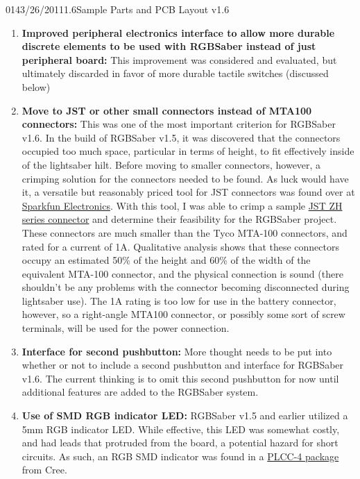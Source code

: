 \documentclass[12pt,letterpaper,onecolumn]{article}
\begin{document}
\begin{nbentry}{014}{3/26/2011}{1.6}{Sample Parts and PCB Layout v1.6}
\begin{enumerate}
\item \textbf{Improved peripheral electronics interface to allow more durable discrete elements to be used with RGBSaber instead of just peripheral board:} This improvement was considered and evaluated, but ultimately discarded in favor of more durable tactile switches (discussed below)
\item \textbf{Move to JST or other small connectors instead of MTA100 connectors:} This was one of the most important criterion for RGBSaber v1.6. In the build of RGBSaber v1.5, it was discovered that the connectors occupied too much space, particular in terms of height, to fit effectively inside of the lightsaber hilt. Before moving to smaller connectors, however, a crimping solution for the connectors needed to be found. As luck would have it, a versatile but reasonably priced tool for JST connectors was found over at \href{http://www.sparkfun.com/products/10219}{Sparkfun Electronics}. With this tool, I was able to crimp a sample \href{http://www.jst-mfg.com/product/pdf/eng/eZH.pdf}{JST ZH series connector} and determine their feasibility for the RGBSaber project. These connectors are much smaller than the Tyco MTA-100 connectors, and rated for a current of 1A. Qualitative analysis shows that these connectors occupy an estimated 50\% of the height and 60\% of the width of the equivalent MTA-100 connector, and the physical connection is sound (there shouldn't be any problems with the connector becoming disconnected during lightsaber use). The 1A rating is too low for use in the battery connector, however, so a right-angle MTA100 connector, or possibly some sort of screw terminals, will be used for the power connection.
\item \textbf{Interface for second pushbutton:} More thought needs to be put into whether or not to include a second pushbutton and interface for RGBSaber v1.6. The current thinking is to omit this second pushbutton for now until additional features are added to the RGBSaber system.
\item \textbf{Use of SMD RGB indicator LED:} RGBSaber v1.5 and earlier utilized a 5mm RGB indicator LED. While effective, this LED was somewhat costly, and had leads that protruded from the board, a potential hazard for short circuits. As such, an RGB SMD indicator was found in a \href{http://search.digikey.com/scripts/DkSearch/dksus.dll?Detail\&name=CLV1A-FKB-CJ1M1F1BB7R4S3CT-ND}{PLCC-4 package} from Cree.

\end{enumerate}
\end{nbentry}
\end{document}
